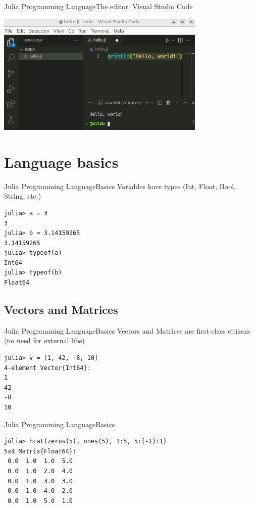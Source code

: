 \documentclass[11pt]{beamer}
\begin{document}
\begin{frame}[fragile]{Julia Programming Language}{The editor: Visual Studio Code}
	\begin{center}
		\includegraphics[width=10cm]{images/vscode.png}
	\end{center}
\end{frame}

\section{Language basics}
\begin{frame}[fragile]{Julia Programming Language}{Basics}
Variables have types (Int, Float, Bool, String, etc.)
\begin{lstlisting}
julia> a = 3
3
julia> b = 3.14159265
3.14159265
julia> typeof(a)
Int64
julia> typeof(b)
Float64
\end{lstlisting}
\end{frame}

\subsection{Vectors and Matrices}
\begin{frame}[fragile]{Julia Programming Language}{Basics}
Vectors and Matrices are first-class citizens (no need for external libs)
\begin{lstlisting}
julia> v = [1, 42, -8, 10]
4-element Vector{Int64}:
1
42
-8
10
\end{lstlisting}
\end{frame}


\begin{frame}[fragile]{Julia Programming Language}{Basics}
\begin{lstlisting}
julia> hcat(zeros(5), ones(5), 1:5, 5:(-1):1)
5x4 Matrix{Float64}:
 0.0  1.0  1.0  5.0
 0.0  1.0  2.0  4.0
 0.0  1.0  3.0  3.0
 0.0  1.0  4.0  2.0
 0.0  1.0  5.0  1.0
\end{lstlisting}
\end{frame}
\end{document}
